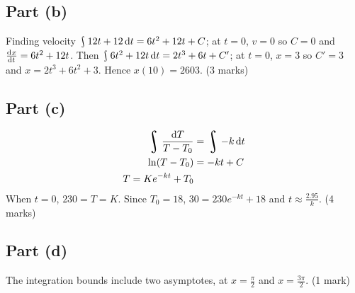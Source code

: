 \documentclass[a4paper]{report}
\DeclareMathOperator*{\rint}{\scalerel*{\rotatebox{17}{$\!\int\!$}}{\int}}
\begin{document}
\subsection*{Part (b)}
Finding velocity $ \rint 12t + 12 \dif{t} = 6t^2 + 12t + C $; at $ t = 0 $, $ v = 0 $ so $ C = 0 $ and $ \od{x}{t} = 6t^2 + 12t $.
Then $ \rint 6t^2 + 12t \dif{t} = 2t^3 + 6t + C' $; at $ t = 0 $, $ x = 3 $ so $ C' = 3 $ and $ x = 2t^3 + 6t^2 + 3 $. Hence $ x(10) = 2603 $.
(3 marks)

\subsection*{Part (c)}
\begin{align*}
  \rint \frac{\dif{T}}{T - T_0} &= \rint -k \dif{t}\\
  \ln (T - T_0) &= -kt + C\\
  T = Ke^{-kt} + T_0
\end{align*}
When $ t = 0 $, $ 230 = T = K $. Since $ T_0 = 18 $, $ 30 = 230e^{-kt} + 18 $
and $ t \approx \frac{2.95}{k} $.
(4 marks)

\subsection*{Part (d)}
The integration bounds include two asymptotes, at $ x = \frac{\pi}{2} $ and $ x =\frac{3\pi}{2} $.
(1 mark)
\end{document}

